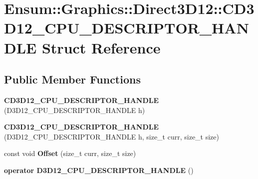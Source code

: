 \hypertarget{struct_ensum_1_1_graphics_1_1_direct3_d12_1_1_c_d3_d12___c_p_u___d_e_s_c_r_i_p_t_o_r___h_a_n_d_l_e}{}\section{Ensum\+:\+:Graphics\+:\+:Direct3\+D12\+:\+:C\+D3\+D12\+\_\+\+C\+P\+U\+\_\+\+D\+E\+S\+C\+R\+I\+P\+T\+O\+R\+\_\+\+H\+A\+N\+D\+LE Struct Reference}
\label{struct_ensum_1_1_graphics_1_1_direct3_d12_1_1_c_d3_d12___c_p_u___d_e_s_c_r_i_p_t_o_r___h_a_n_d_l_e}
\subsection*{Public Member Functions}
\begin{DoxyCompactItemize}
\item 
{\bfseries C\+D3\+D12\+\_\+\+C\+P\+U\+\_\+\+D\+E\+S\+C\+R\+I\+P\+T\+O\+R\+\_\+\+H\+A\+N\+D\+LE} (D3\+D12\+\_\+\+C\+P\+U\+\_\+\+D\+E\+S\+C\+R\+I\+P\+T\+O\+R\+\_\+\+H\+A\+N\+D\+LE h)\hypertarget{struct_ensum_1_1_graphics_1_1_direct3_d12_1_1_c_d3_d12___c_p_u___d_e_s_c_r_i_p_t_o_r___h_a_n_d_l_e_a01bd224f75bf7842350de95121f4dfcf}{}\label{struct_ensum_1_1_graphics_1_1_direct3_d12_1_1_c_d3_d12___c_p_u___d_e_s_c_r_i_p_t_o_r___h_a_n_d_l_e_a01bd224f75bf7842350de95121f4dfcf}

\item 
{\bfseries C\+D3\+D12\+\_\+\+C\+P\+U\+\_\+\+D\+E\+S\+C\+R\+I\+P\+T\+O\+R\+\_\+\+H\+A\+N\+D\+LE} (D3\+D12\+\_\+\+C\+P\+U\+\_\+\+D\+E\+S\+C\+R\+I\+P\+T\+O\+R\+\_\+\+H\+A\+N\+D\+LE h, size\+\_\+t curr, size\+\_\+t size)\hypertarget{struct_ensum_1_1_graphics_1_1_direct3_d12_1_1_c_d3_d12___c_p_u___d_e_s_c_r_i_p_t_o_r___h_a_n_d_l_e_ab90bca624384c3162583a000044d2dce}{}\label{struct_ensum_1_1_graphics_1_1_direct3_d12_1_1_c_d3_d12___c_p_u___d_e_s_c_r_i_p_t_o_r___h_a_n_d_l_e_ab90bca624384c3162583a000044d2dce}

\item 
const void {\bfseries Offset} (size\+\_\+t curr, size\+\_\+t size)\hypertarget{struct_ensum_1_1_graphics_1_1_direct3_d12_1_1_c_d3_d12___c_p_u___d_e_s_c_r_i_p_t_o_r___h_a_n_d_l_e_a8ca593a4b65c813941433d3a7f36f940}{}\label{struct_ensum_1_1_graphics_1_1_direct3_d12_1_1_c_d3_d12___c_p_u___d_e_s_c_r_i_p_t_o_r___h_a_n_d_l_e_a8ca593a4b65c813941433d3a7f36f940}

\item 
{\bfseries operator D3\+D12\+\_\+\+C\+P\+U\+\_\+\+D\+E\+S\+C\+R\+I\+P\+T\+O\+R\+\_\+\+H\+A\+N\+D\+LE} ()\hypertarget{struct_ensum_1_1_graphics_1_1_direct3_d12_1_1_c_d3_d12___c_p_u___d_e_s_c_r_i_p_t_o_r___h_a_n_d_l_e_a2672d9462146a5ad1b923131a794354b}{}\label{struct_ensum_1_1_graphics_1_1_direct3_d12_1_1_c_d3_d12___c_p_u___d_e_s_c_r_i_p_t_o_r___h_a_n_d_l_e_a2672d9462146a5ad1b923131a794354b}

\end{DoxyCompactItemize}

